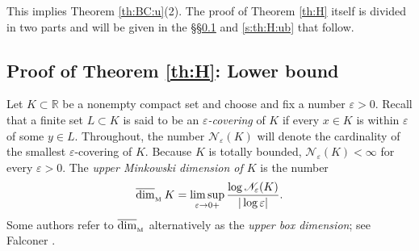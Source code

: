 \documentclass[reqno]{amsart}
\DeclareMathOperator{\dimm}{\overline{dim}_{_{\rm M}}}
\newcommand{\<}{\langle}
\renewcommand{\>}{\rangle}
\newcommand{\R}{\mathbb{R}}
\newcommand{\1}{\mathbb{1}}
\theoremstyle{definition}
\numberwithin{equation}{section}
\begin{document}
This implies Theorem \ref{th:BC:u}(2).
The proof of Theorem \ref{th:H} itself is divided in two parts and will be 
given in the \S\S\ref{s:th:H:lb} and \ref{s:th:H:ub} that follow.


\subsection{Proof of Theorem \ref{th:H}: Lower bound}\label{s:th:H:lb}
Let $K\subset\R$ be a nonempty compact set and choose and fix
a number $\varepsilon>0$. Recall that a finite set $L\subset K$ is said to be an
\emph{$\varepsilon$-covering}
of $K$ if every $x\in K$ is within $\varepsilon$ of some $y\in L$. 
Throughout, the number 
$\mathscr{N}_\varepsilon(K)$ will denote the cardinality of the smallest $\varepsilon$-covering of $K$.
Because $K$ is totally bounded, $\mathscr{N}_\varepsilon(K)<\infty$ for every $\varepsilon>0$.
The \emph{upper Minkowski dimension of $K$} is the number
\begin{equation}\label{dimm1}
	\dimm K = \limsup_{\varepsilon\to0+}
	\frac{\log \mathscr{N}_\varepsilon(K)}{|\log\varepsilon|}.
\end{equation}
Some authors refer to $\dimm$ alternatively as the  \emph{upper box dimension};
see Falconer \cite{Falconer}.
\end{document}

